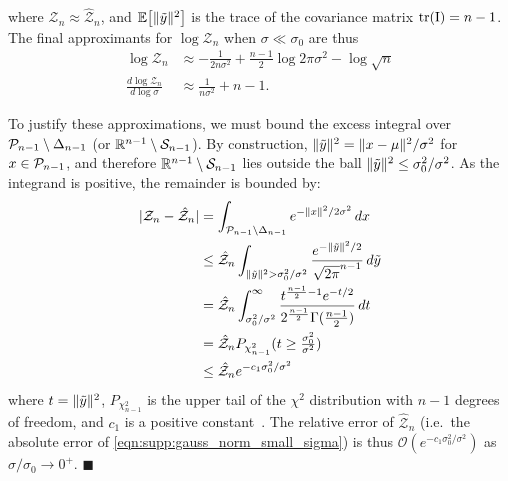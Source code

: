where $\mathcal{Z}_n \approx \hat{\mathcal{Z}}_n$, and $\Ex{\lVert \tilde{\vv{y}} \rVert^2}$ is the trace of the covariance matrix $\Tr{\Id} = n-1$.
The final approximants for $\log\mathcal{Z}_n$ when $\sigma \ll \sigma_0$ are thus
\begin{align}
    \log\mathcal{Z}_n                        & \approx -\frac{1}{2 n \sigma^2} + \frac{n-1}{2} \log 2\pi\sigma^2 - \log\sqrt{n}  \label{eqn:supp:gauss_norm_small_sigma} \\
    \frac{d \log\mathcal{Z}_n}{d \log\sigma} & \approx \frac{1}{n \sigma^2} + n - 1. \label{eqn:supp:gauss_norm_deriv_small_sigma}
\end{align}

To justify these approximations, we must bound the excess integral over $\mathcal{P}_{n-1} \setminus \Delta_{n-1}$ (or $\mathbb{R}^{n-1} \setminus \mathcal{S}_{n-1}$).
By construction, $\lVert \tilde{y} \rVert^2 = \lVert x - \mu \rVert^2 / \sigma^2$ for $x \in \mathcal{P}_{n-1}$, and therefore $\mathbb{R}^{n-1} \setminus \mathcal{S}_{n-1}$ lies outside the ball $\lVert \tilde{y} \rVert^2 \le \sigma_0^2 / \sigma^2$.
As the integrand is positive, the remainder is bounded by:
\begin{align*}
    | \mathcal{Z}_n - \hat{\mathcal{Z}}_n | & = \int_{\mathcal{P}_{n-1} \setminus \Delta_{n-1}} e^{ -\lVert x \rVert^2 / 2 \sigma^2 } \, dx                                                               \\
                                            & \le \hat{\mathcal{Z}}_n \int_{\lVert \tilde{y} \rVert^2 > \sigma_0^2 / \sigma^2} \frac{e^{-\lVert \tilde{y} \rVert^2 / 2}}{\sqrt{2\pi}^{n-1}} \, d\tilde{y} \\
                                            & = \hat{\mathcal{Z}}_n \int_{\sigma_0^2 / \sigma^2}^{\infty} \frac{t^{\frac{n-1}{2} - 1} e^{-t/2}}{2^{\frac{n-1}{2}} \Gamma(\tfrac{n-1}{2})} \, dt                          \\
                                            & = \hat{\mathcal{Z}}_n P_{\chi^2_{n-1}}( t \ge \tfrac{\sigma_0^2}{\sigma^2} )                                                                                               \\
                                            & \le \hat{\mathcal{Z}}_n e^{-c_1 \sigma_0^2 / \sigma^2}
\end{align*}
where $t=\lVert \tilde{y} \rVert^2$, $P_{\chi^2_{n-1}}$ is the upper tail of the $\chi^2$ distribution with $n-1$ degrees of freedom, and $c_1$ is a positive constant~\citep{laurent_adaptive_2000, zhang_non-asymptotic_2020}.
The relative error of $\hat{\mathcal{Z}}_n$ (i.e.\ the absolute error of \eqref{eqn:supp:gauss_norm_small_sigma}) is thus $\mathcal{O}(e^{-c_1 \sigma_0^2 / \sigma^2})$ as $\sigma/\sigma_0 \to 0^+$.
$\blacksquare$

